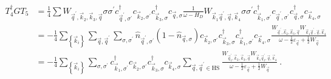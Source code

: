 \documentclass{revtex4-2}
\begin{document}
\begin{equation}\begin{aligned}
	T_4^\dagger G T_5 &= \frac{1}{4}\sum W_{\vec q^\prime, \vec k_2, \vec k_3, \vec q} \sigma\sigma^\prime c^\dagger_{\vec q^\prime,\sigma^\prime}c_{\vec k_2,\sigma^\prime}c^\dagger_{\vec k_3,\sigma}c_{\vec q,\sigma} \frac{1}{\omega - H_D} W_{\vec k_1 \vec q^\prime, \vec q, \vec k_4} \sigma\sigma^\prime c^\dagger_{\vec k_1,\sigma^\prime}c_{\vec q^\prime,\sigma^\prime}c^\dagger_{\vec q,\sigma}c_{\vec k_4,\sigma}\\
		  &= -\frac{1}{4}\sum_{\left\{ \vec k_i \right\} }\sum_{\vec q,\vec q^\prime}\sum_{\sigma,\sigma^\prime} \hat n_{\vec q^\prime,\sigma^\prime} \left(1 - \hat n_{\vec q,\sigma}\right) c_{\vec k_2,\sigma^\prime} c^\dagger_{\vec k_3,\sigma} c^\dagger_{\vec k_1,\sigma^\prime}c_{\vec k_4,\sigma}  \frac{W_{\vec q^\prime, \vec k_2, \vec k_3, \vec q} W_{\vec k_1 \vec q^\prime, \vec q, \vec k_4}}{\omega - \frac{1}{2}\varepsilon_{\vec q}  + \frac{1}{2}W_{\vec q}}  \\
		  &= -\frac{1}{4}\sum_{\left\{ \vec k_i \right\}}\sum_{\sigma,\sigma^\prime} c^\dagger_{\vec k_1,\sigma^\prime}c_{\vec k_2,\sigma^\prime}c^\dagger_{\vec k_3,\sigma} c_{\vec k_4,\sigma} \sum_{\vec q, \vec q^\prime \in \text{HS}}\frac{W_{\vec q_t^\prime, \vec k_2, \vec k_3, \vec q} W_{\vec k_1 \vec q_t^\prime, \vec q, \vec k_4}}{\omega - \frac{1}{2}\varepsilon_{\vec q}  + \frac{1}{2}W_{\vec q}}~.
\end{aligned}\end{equation}
\end{document}
